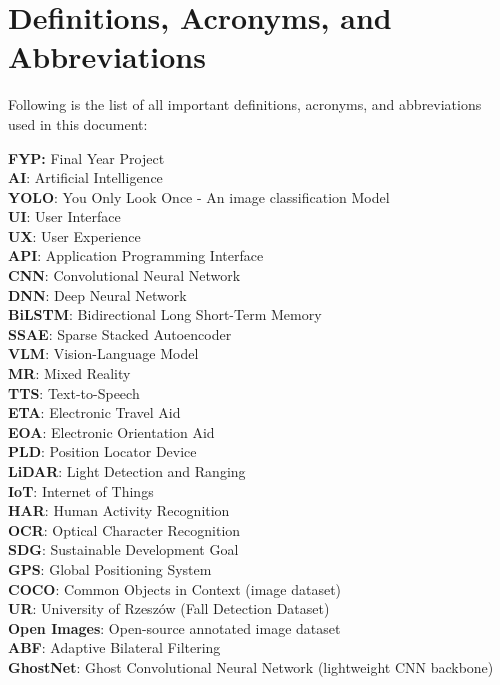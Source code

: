 \documentclass{FastFyp}
\begin{document}
\section{Definitions, Acronyms, and Abbreviations}
Following is the list of all important definitions, acronyms, and abbreviations used in this document:

\textbf{FYP:} Final Year Project\\
\textbf{AI}: Artificial Intelligence\\
\textbf{YOLO}: You Only Look Once - An image classification Model\\
\textbf{UI}: User Interface\\
\textbf{UX}: User Experience\\
\textbf{API}: Application Programming Interface\\
\textbf{CNN}: Convolutional Neural Network  \\
\textbf{DNN}: Deep Neural Network  \\
\textbf{BiLSTM}: Bidirectional Long Short-Term Memory \\ 
\textbf{SSAE}: Sparse Stacked Autoencoder  \\
\textbf{VLM}: Vision-Language Model  \\
\textbf{MR}: Mixed Reality  \\
\textbf{TTS}: Text-to-Speech  \\
\textbf{ETA}: Electronic Travel Aid  \\
\textbf{EOA}: Electronic Orientation Aid  \\
\textbf{PLD}: Position Locator Device  \\
\textbf{LiDAR}: Light Detection and Ranging  \\
\textbf{IoT}: Internet of Things  \\
\textbf{HAR}: Human Activity Recognition  \\
\textbf{OCR}: Optical Character Recognition  \\
\textbf{SDG}: Sustainable Development Goal  \\
\textbf{GPS}: Global Positioning System  \\
\textbf{COCO}: Common Objects in Context (image dataset) \\ 
\textbf{UR}: University of Rzeszów (Fall Detection Dataset)  \\
\textbf{Open Images}: Open-source annotated image dataset \\ 
\textbf{ABF}: Adaptive Bilateral Filtering  \\
\textbf{GhostNet}: Ghost Convolutional Neural Network (lightweight CNN backbone)  \\
\end{document}
